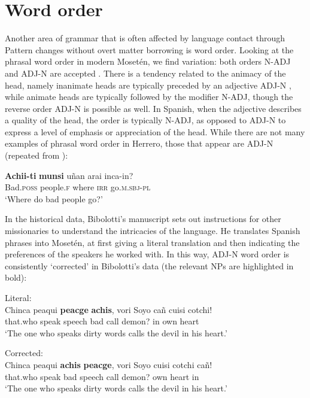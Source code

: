 \documentclass[output=paper,colorlinks,citecolor=brown
]{langscibook}
\begin{document}
\section{Word order}
Another area of grammar that is often affected by language contact through Pattern changes without overt matter borrowing is word order. Looking at the phrasal word order in modern Mosetén, we find variation: both orders N-ADJ and ADJ-N are accepted \citep[103]{sakel2004grammar}. There is a tendency related to the animacy of the head, namely inanimate heads are typically preceded by an adjective ADJ-N , while animate heads are typically followed by the modifier N-ADJ, though the reverse order ADJ-N is possible as well. In Spanish, when the adjective describes a quality of the head, the order is typically N-ADJ, as opposed to ADJ-N to express a level of emphasis or appreciation of the head.
While there are not many examples of phrasal word order in Herrero, those that appear are ADJ-N (repeated from ):

\ea \label{sakel_example_14}
\gll \textbf{Achii-ti} 	\textbf{munsi} 		uñan 	arai  	inca-in?\\
     Bad.\textsc{poss}	people.\textsc{f}	where	\textsc{irr} 	go.\textsc{m.sbj-pl}\\
\glt ‘Where do bad people go?’
\z	

In the historical data, Bibolotti’s manuscript sets out instructions for other missionaries to understand the intricacies of the language. He translates Spanish phrases into Mosetén, at first giving a literal translation and then indicating the preferences of the speakers he worked with. In this way, ADJ-N word order is consistently ‘corrected’ in Bibolotti’s data (the relevant NPs are highlighted in bold): 


\ea \label{sakel_example_15}Literal:\\
\gll Chinca  peaqui  \textbf{peacge}  \textbf{achis},  vori    Soyo    cañ cuisi   cotchi!\\
     that.who   speak    speech  bad	call   demon?    in  own heart\\
\glt ‘The one who speaks dirty words calls the devil in his heart.’
\z	


\ea \label{sakel_example_16}Corrected:\\
\gll Chinca  peaqui  \textbf{achis}  \textbf{peacge},  vori    Soyo   cuisi   cotchi  cañ!\\
     that.who   speak    bad    speech	call   demon?  own heart   in\\
\glt ‘The one who speaks dirty words calls the devil in his heart.’
\z	
\end{document}
